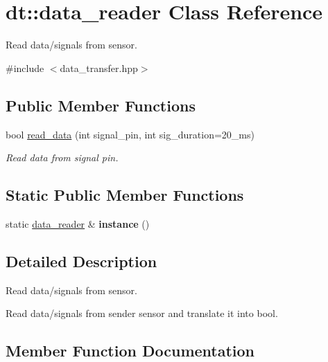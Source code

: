 \hypertarget{classdt_1_1data__reader}{}\section{dt\+:\+:data\+\_\+reader Class Reference}
\label{classdt_1_1data__reader}


Read data/signals from sensor.  




{\ttfamily \#include $<$data\+\_\+transfer.\+hpp$>$}

\subsection*{Public Member Functions}
\begin{DoxyCompactItemize}
\item 
bool \hyperlink{classdt_1_1data__reader_a4ca0a2870b3a03235d7804acf36672ed}{read\+\_\+data} (int signal\+\_\+pin, int sig\+\_\+duration=20\+\_\+ms)
\begin{DoxyCompactList}\small\item\em Read data from signal pin. \end{DoxyCompactList}\end{DoxyCompactItemize}
\subsection*{Static Public Member Functions}
\begin{DoxyCompactItemize}
\item 
\mbox{\label{classdt_1_1data__reader_ab55bdd30fa1dd0d4fc5ec162e911d760}} 
static \hyperlink{classdt_1_1data__reader}{data\+\_\+reader} \& {\bfseries instance} ()
\end{DoxyCompactItemize}


\subsection{Detailed Description}
Read data/signals from sensor. 

Read data/signals from sender sensor and translate it into bool. 

\subsection{Member Function Documentation}
\mbox{\label{classdt_1_1data__reader_a4ca0a2870b3a03235d7804acf36672ed}} 
